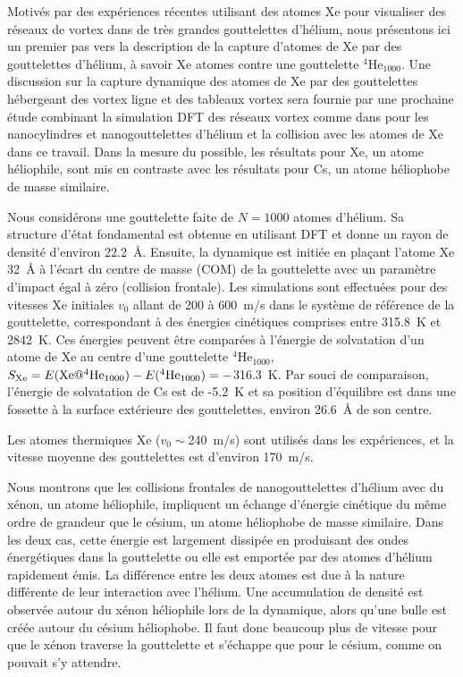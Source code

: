		Motivés par des expériences récentes utilisant des atomes Xe pour visualiser des réseaux de vortex dans de très grandes gouttelettes d'hélium\citep{Gom14,Jon16}, nous présentons ici un premier pas vers la description de la capture d'atomes de Xe par des gouttelettes d'hélium, à savoir Xe atomes contre une gouttelette $^4$He$_{1000}$. Une discussion sur la capture dynamique des atomes de Xe par des gouttelettes hébergeant des vortex ligne et des tableaux vortex sera fournie par une prochaine étude combinant la simulation DFT des réseaux vortex comme dans pour les nanocylindres et nanogouttelettes d'hélium et la collision avec les atomes de Xe dans ce travail. Dans la mesure du possible, les résultats pour Xe, un atome héliophile, sont mis en contraste avec les résultats pour Cs, un atome héliophobe de masse similaire.
		
		Nous considérons une gouttelette faite de $N=1000$ atomes d'hélium. Sa structure d'état fondamental est obtenue en utilisant DFT et donne un rayon de densité d'environ 22.2~\AA. Ensuite, la dynamique est initiée en plaçant l'atome Xe 32~\AA{} à l'écart du centre de masse (COM) de la gouttelette avec un paramètre d'impact égal à zéro (collision frontale). Les simulations sont effectuées pour des vitesses Xe initiales $v_0$ allant de 200 à 600~m/s dans le système de référence de la gouttelette, correspondant à des énergies cinétiques comprises entre 315.8~K et 2842~K. Ces énergies peuvent être comparées à l'énergie de solvatation d'un atome de Xe au centre d'une gouttelette $^4$He$_{1000}$, $S_{{\rm Xe}}=E({\rm Xe}@^4{\rm He}_{1000})-E(^4{\rm He}_{1000})=-$316.3~K. Par souci de comparaison, l'énergie de solvatation de Cs est de -5.2~K et sa position d'équilibre est dans une fossette à la surface extérieure des gouttelettes, environ 26.6~\AA{} de son centre.
		
		Les atomes thermiques Xe ($v_0\!\!\sim$240~m/s) sont utilisés dans les expériences\citep{Gom14,Jon16}, et la vitesse moyenne des gouttelettes est d'environ 170~m/s\citep{Gom11}.
		
		Nous montrons que les collisions frontales de nanogouttelettes d'hélium avec du xénon, un atome héliophile, impliquent un échange d'énergie cinétique du même ordre de grandeur que le césium, un atome héliophobe de masse similaire. Dans les deux cas, cette énergie est largement dissipée en produisant des ondes énergétiques dans la gouttelette ou elle est emportée par des atomes d'hélium rapidement émis. La différence entre les deux atomes est due à la nature différente de leur interaction avec l'hélium. Une accumulation de densité est observée autour du xénon héliophile lors de la dynamique, alors qu'une bulle est créée autour du césium héliophobe. Il faut donc beaucoup plus de vitesse pour que le xénon traverse la gouttelette et s'échappe que pour le césium, comme on pouvait s'y attendre.
	
